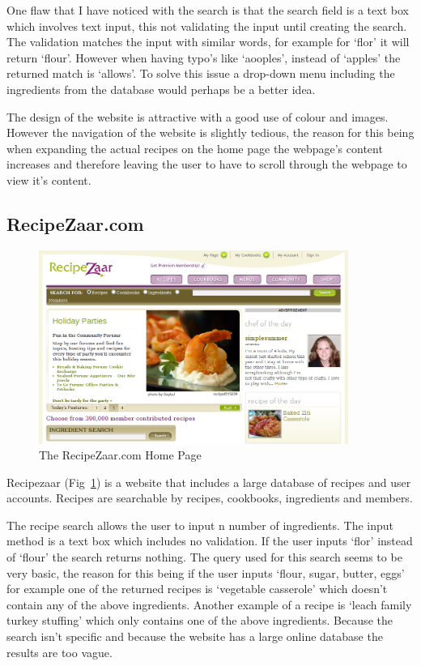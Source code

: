 One flaw that I have noticed with the search is that the search field is a text box which involves text input, this not validating the input until creating the search. The validation matches the input with similar words, for example for ‘flor’ it will return ‘flour’. However when having typo’s like ‘aooples’, instead of ‘apples’ the returned match is ‘allows’. To solve this issue a drop-down menu including the ingredients from the database would perhaps be a better idea.

The design of the website is attractive with a good use of colour and images. However the navigation of the website is slightly tedious, the reason for this being when expanding the actual recipes on the home page the webpage’s content increases and therefore leaving the user to have to scroll through the webpage to view it’s content. 



\subsection{RecipeZaar.com}

\begin{figure}[h]
\includegraphics[width=0.9\textwidth]{screenshot_recipezaar}
\caption{The RecipeZaar.com Home Page}
\label{fig:recipezaar}
\end{figure}

Recipezaar (Fig~\ref{fig:recipezaar}) is a website that includes a large database of recipes and user accounts. Recipes are searchable by recipes, cookbooks, ingredients and members. 

The recipe search allows the user to input n number of ingredients. The input method is a text box which includes no validation. If the user inputs ‘flor’ instead of ‘flour’ the search returns nothing. The query used for this search seems to be very basic, the reason for this being if the user inputs ‘flour, sugar, butter, eggs’ for example one of the returned recipes is ‘vegetable casserole’ which doesn’t contain any of the above ingredients. Another example of a recipe is ‘leach family turkey stuffing’ which only contains one of the above ingredients. Because the search isn’t specific and because the website has a large online database the results are too vague.

